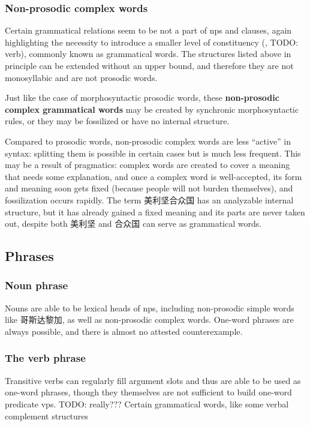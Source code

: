 \documentclass[UTF8, a4paper, oneside, scheme=plain]{ctexrep}
\newcommand*{\concept}[1]{\textbf{#1}}
\begin{document}
\subsubsection{Non-prosodic complex words}\label{sec:pos.word.complex}

Certain grammatical relations seem to be not a part of \ac{np}s and clauses,
again highlighting the necessity to introduce a smaller level of constituency
(, TODO: verb),
commonly known as grammatical words.
The structures listed above in principle 
can be extended without an upper bound, 
and therefore they are not monosyllabic and are not prosodic words.

Just like the case of morphosyntactic prosodic words,
these \concept{non-prosodic complex grammatical words} 
may be created by synchronic morphosyntactic rules,
or they may be fossilized or have no internal structure.

Compared to prosodic words,
non-prosodic complex words are less ``active'' in syntax:
splitting them is possible in certain cases
but is much less frequent.
This may be a result of pragmatics:
complex words are created to cover a meaning that needs some explanation,
and once a complex word is well-accepted,
its form and meaning soon gets fixed 
(because people will not burden themselves),
and fossilization occurs rapidly.
The term 美利坚合众国 has an analyzable internal structure,
but it has already gained a fixed meaning 
and its parts are never taken out,
despite both 美利坚 and 合众国 can serve as grammatical words.


\subsection{Phrases}

\subsubsection{Noun phrase}

Nouns are able to be lexical heads of \acs{np}s,
including non-prosodic simple words like 哥斯达黎加,
as well as non-prosodic complex words.
One-word phrases are always possible,
and there is almost no attested counterexample.

\subsubsection{The verb phrase}

Transitive verbs can regularly fill argument slots 
and thus are able to be used as one-word phrases,
though they themselves are not sufficient to build one-word predicate \ac{vp}s. TODO: really???
Certain grammatical words,
like some verbal complement structures 
\end{document}
